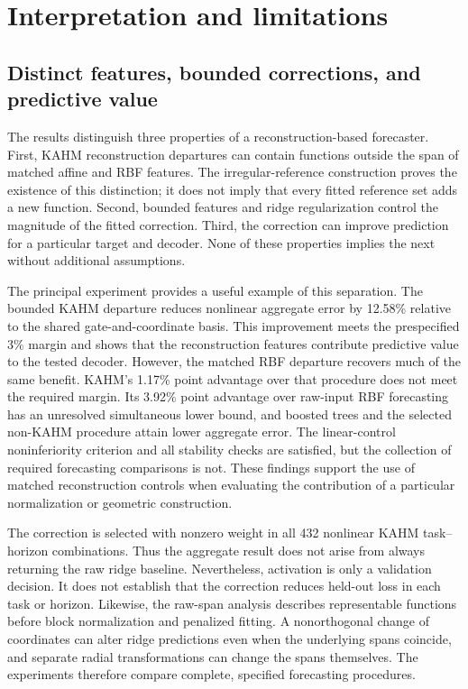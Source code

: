 \section{Interpretation and limitations}\label{sec:discussion}

\subsection{Distinct features, bounded corrections, and predictive value}
The results distinguish three properties of a reconstruction-based
forecaster. First, KAHM reconstruction departures can contain functions
outside the span of matched affine and RBF features. The irregular-reference
construction proves the existence of this distinction; it does not imply
that every fitted reference set adds a new function. Second, bounded
features and ridge regularization control the magnitude of the fitted
correction. Third, the correction can improve prediction for a particular
target and decoder. None of these properties implies the next without
additional assumptions.

The principal experiment provides a useful example of this separation.
The bounded KAHM departure reduces nonlinear aggregate error by 12.58\%
relative to the shared gate-and-coordinate basis. This improvement meets
the prespecified 3\% margin and shows that the reconstruction features
contribute predictive value to the tested decoder. However, the matched
RBF departure recovers much of the same benefit. KAHM's 1.17\% point
advantage over that procedure does not meet the required margin. Its
3.92\% point advantage over raw-input RBF forecasting has an unresolved
simultaneous lower bound, and boosted trees and the selected non-KAHM
procedure attain lower aggregate error. The linear-control noninferiority
criterion and all stability checks are satisfied, but the collection of
required forecasting comparisons is not. These findings support the use
of matched reconstruction controls when evaluating the contribution of a
particular normalization or geometric construction.

The correction is selected with nonzero weight in all 432 nonlinear
KAHM task--horizon combinations. Thus the aggregate result does not arise
from always returning the raw ridge baseline. Nevertheless, activation
is only a validation decision. It does not establish that the correction
reduces held-out loss in each task or horizon. Likewise, the raw-span
analysis describes representable functions before block normalization
and penalized fitting. A nonorthogonal change of coordinates can alter
ridge predictions even when the underlying spans coincide, and separate
radial transformations can change the spans themselves. The experiments
therefore compare complete, specified forecasting procedures.

